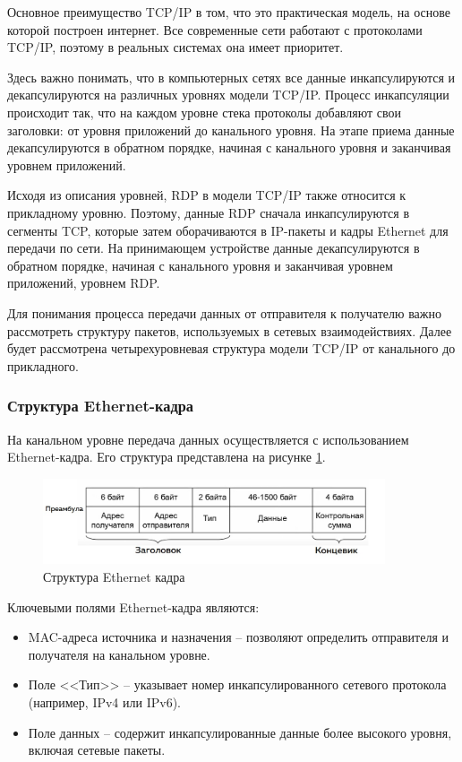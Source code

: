 \documentclass[spec, och, diploma]{SCWorks}
\begin{document}
Основное преимущество TCP/IP в том, что это практическая модель, на основе которой построен интернет. Все современные сети работают 
с протоколами TCP/IP, поэтому в реальных системах она имеет приоритет.

Здесь важно понимать, что в компьютерных сетях все данные инкапсулируются и декапсулируются на различных уровнях модели TCP/IP.
Процесс инкапсуляции происходит так, что на каждом уровне стека 
протоколы добавляют свои заголовки: от уровня приложений до канального уровня. На этапе приема данные декапсулируются в обратном порядке, начиная 
с канального уровня и заканчивая уровнем приложений. 

Исходя из описания уровней, RDP в модели TCP/IP также относится к прикладному уровню. Поэтому, данные RDP сначала инкапсулируются в сегменты TCP, 
которые затем оборачиваются в IP-пакеты и кадры Ethernet для передачи по сети. На принимающем устройстве данные декапсулируются в обратном 
порядке, начиная с канального уровня и заканчивая уровнем приложений, уровнем RDP.

Для понимания процесса передачи данных от отправителя к получателю важно рассмотреть структуру пакетов, используемых в сетевых взаимодействиях. Далее
будет рассмотрена четырехуровневая структура модели TCP/IP от канального до прикладного. 


\subsubsection{Структура Ethernet-кадра}

На канальном уровне передача данных осуществляется с использованием Ethernet-кадра. Его структура представлена на рисунке \ref{eth-frame}.

\begin{figure}[H]
  \centering
  \includegraphics[width=0.9\textwidth]{pics/eth-frame.jpg}
  \caption{Структура Ethernet кадра}
  \label{eth-frame}
\end{figure}

Ключевыми полями Ethernet-кадра являются:

\begin{itemize}
  \item MAC-адреса источника и назначения -- позволяют определить отправителя и получателя на канальном уровне.
  \item Поле <<Тип>> -- указывает номер инкапсулированного сетевого протокола (например, IPv4 или IPv6).
  \item Поле данных -- содержит инкапсулированные данные более высокого уровня, включая сетевые пакеты.
\end{itemize}
\end{document}
